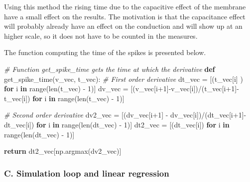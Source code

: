 \documentclass[]{article}
\newenvironment{Shaded}{}{}
\newcommand{\BuiltInTok}[1]{#1}
\newcommand{\CommentTok}[1]{\textcolor[rgb]{0.38,0.63,0.69}{\textit{#1}}}
\newcommand{\ControlFlowTok}[1]{\textcolor[rgb]{0.00,0.44,0.13}{\textbf{#1}}}
\newcommand{\DecValTok}[1]{\textcolor[rgb]{0.25,0.63,0.44}{#1}}
\newcommand{\KeywordTok}[1]{\textcolor[rgb]{0.00,0.44,0.13}{\textbf{#1}}}
\newcommand{\NormalTok}[1]{#1}
\newcommand{\OperatorTok}[1]{\textcolor[rgb]{0.40,0.40,0.40}{#1}}
\begin{document}
Using this method the rising time due to the capacitive effect of the
membrane have a small effect on the results. The motivation is that the
capacitance effect will probably already have an effect on the
conduction and will show up at an higher scale, so it does not have to
be counted in the measures.

The function computing the time of the spikes is presented below.

\begin{Shaded}
\begin{Highlighting}[]
\CommentTok{# Function get_spike_time gets the time at which the derivative  }
\KeywordTok{def}\NormalTok{ get_spike_time(v_vec, t_vec):}
    \CommentTok{# First order derivative}
\NormalTok{    dt_vec }\OperatorTok{=}\NormalTok{ [(t_vec[i] ) }\ControlFlowTok{for}\NormalTok{ i }\KeywordTok{in} \BuiltInTok{range}\NormalTok{(}\BuiltInTok{len}\NormalTok{(t_vec) }\OperatorTok{-} \DecValTok{1}\NormalTok{)]}
\NormalTok{    dv_vec }\OperatorTok{=}\NormalTok{ [(v_vec[i}\OperatorTok{+}\DecValTok{1}\NormalTok{]}\OperatorTok{-}\NormalTok{v_vec[i])}\OperatorTok{/}\NormalTok{(t_vec[i}\OperatorTok{+}\DecValTok{1}\NormalTok{]}\OperatorTok{-}\NormalTok{t_vec[i]) }\ControlFlowTok{for}\NormalTok{ i }\KeywordTok{in} \BuiltInTok{range}\NormalTok{(}\BuiltInTok{len}\NormalTok{(t_vec) }\OperatorTok{-} \DecValTok{1}\NormalTok{)]}

    \CommentTok{# Second order derivative}
\NormalTok{    dv2_vec }\OperatorTok{=}\NormalTok{ [(dv_vec[i}\OperatorTok{+}\DecValTok{1}\NormalTok{] }\OperatorTok{-}\NormalTok{ dv_vec[i])}\OperatorTok{/}\NormalTok{(dt_vec[i}\OperatorTok{+}\DecValTok{1}\NormalTok{]}\OperatorTok{-}\NormalTok{dt_vec[i])}
                   \ControlFlowTok{for}\NormalTok{ i }\KeywordTok{in} \BuiltInTok{range}\NormalTok{(}\BuiltInTok{len}\NormalTok{(dt_vec) }\OperatorTok{-} \DecValTok{1}\NormalTok{)]}
\NormalTok{    dt2_vec }\OperatorTok{=}\NormalTok{ [(dt_vec[i]) }\ControlFlowTok{for}\NormalTok{ i }\KeywordTok{in} \BuiltInTok{range}\NormalTok{(}\BuiltInTok{len}\NormalTok{(dt_vec) }\OperatorTok{-} \DecValTok{1}\NormalTok{)]}

    \ControlFlowTok{return}\NormalTok{ dt2_vec[np.argmax(dv2_vec)]}
\end{Highlighting}
\end{Shaded}

\hypertarget{c.-simulation-loop-and-linear-regression}{%
\subsubsection{C. Simulation loop and linear
regression}\label{c.-simulation-loop-and-linear-regression}}
\end{document}

